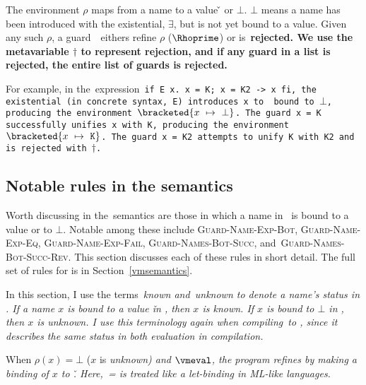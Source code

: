 \documentclass[manuscript,screen 12pt, nonacm]{acmart}
\begin{document}


The environment $\rho$ maps from a name to a value {\v} or $\bot$. $\bot$ means
a name has been introduced with the existential, $\exists$, but is not yet bound
to a value. Given any such $\rho$, a guard~\g\ eithers refine $\rho$
($\Rhoprime$) or is~\bf{rejected}. We use the metavariable $\dagger$ to
represent rejection, and if any guard in a list is rejected, the entire list of
guards is rejected.

    \gfail

  For example, in the~\VMinus expression~\tt{if E x. x = K; x = K2 -> x fi}, the
  existential (in concrete syntax,~\tt{E}) introduces~\tt{x} to~\Rho\ bound to
  $\bot$, producing the environment $\bracketed{x~\mapsto~\bot}$. The guard
  \tt{x = K} successfully unifies~\tt{x} with~\tt{K}, producing the environment
  $\bracketed{x~\mapsto~\tt{K}}$. The guard~\tt{x = K2} attempts to unify~\tt{K}
  with~\tt{K2} and is rejected with $\dagger$. 

  \subsection{Notable rules in the \VMinus semantics}

  Worth discussing in the~\VMinus semantics are those in which a name in \Rho\
  is bound to a value or to $\bot$. Notable among these include
  \textsc{Guard-Name-Exp-Bot}, \textsc{Guard-Name-Exp-Eq},
  \textsc{Guard-Name-Exp-Fail}, \textsc{Guard-Names-Bot-Succ},
  and~\textsc{Guard-Names-Bot-Succ-Rev}. This section discusses each of these
  rules in short detail. The full set of rules for \VMinus is in
  Section~\ref{vmsemantics}. 

  In this section, I use the terms~\it{known} and~\it{unknown} to denote a
  name's status in \Rho. If a name $x$ is bound to a value \v in \Rho, then $x$
  is \it{known}. If $x$ is bound to $\bot$ in \Rho, then $x$ is \it{unknown}. I
  use this terminology again when compiling~\VMinus to \D, since it describes
  the same status in both evaluation in compilation. 

  \bigskip 

\guardnameexpbot

When $\rho(x) = \bot$ ($x$ is \it{unknown}) and $\vmeval$, the program refines
\Rho by making a binding of $x$ to \v. Here,~\it{=} is treated like a
let-binding in ML-like languages. 
\end{document}

